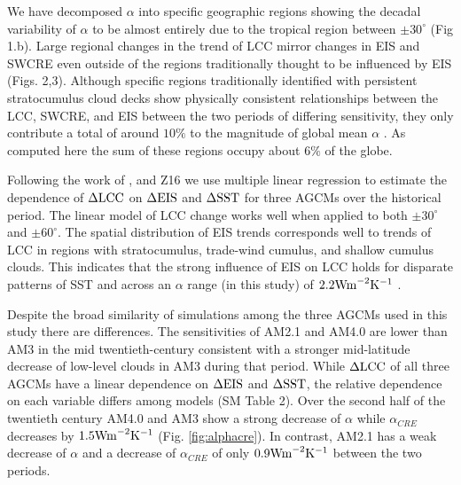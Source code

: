 We have decomposed $\alpha$ into specific geographic regions showing the decadal variability of $\alpha$ to be almost
entirely due to the tropical region between $\pm 30^{\circ}$ (Fig 1.b).   Large regional changes in the trend of LCC mirror changes in EIS and SWCRE even outside of the regions traditionally thought to be influenced by EIS (Figs. 2,3).  Although specific regions traditionally identified with persistent stratocumulus cloud decks show physically consistent relationships between the LCC, SWCRE, and EIS between the two periods of differing sensitivity, they only contribute a total of around $10\%$ to the magnitude of global mean $\alpha$ .  As computed here the sum of these regions occupy about $6\%$ of the globe.
     

Following the work of \citet{Qu_etal_2014, Qu_etal_2015}, and Z16 we use multiple linear regression to estimate the dependence of $\Delta \rm{LCC}$ on $\Delta \rm{EIS}$ and $\Delta \rm{SST}$ for three AGCMs over the historical period.  
The linear model of LCC change works well when applied to both $\pm 30^{\circ}$ and  $\pm 60^{\circ}$.
 The spatial distribution of EIS trends corresponds well to trends of LCC in regions with stratocumulus, trade-wind cumulus, and shallow cumulus clouds.  This indicates that the strong influence of EIS on LCC holds for disparate patterns of SST and across an $\alpha$ range (in this study) of $2.2 \rm{W m}^{-2} \rm{K}^{-1}$ . 

Despite the broad similarity of simulations among the three AGCMs used in this study there are differences.  The sensitivities of AM2.1 and AM4.0 are lower than AM3 in the mid twentieth-century consistent with a stronger mid-latitude decrease of low-level clouds in AM3 during that period.  While $\Delta \rm{LCC}$ of all three AGCMs have a linear dependence on $\Delta \rm{EIS}$ and $\Delta \rm{SST}$, the relative dependence on each variable differs among models (SM Table 2).  Over the second half of the twentieth century AM4.0 and AM3 show a strong decrease of $\alpha$ while $\alpha_{CRE}$ decreases by $1.5 \rm{W m}^{-2} \rm{K}^{-1}$ (Fig. \ref{fig:alphacre}).  In contrast, AM2.1 has a weak decrease of $\alpha$ and a decrease of $\alpha_{CRE}$ of only $0.9 \rm{W m}^{-2} \rm{K}^{-1}$ between the two periods.


